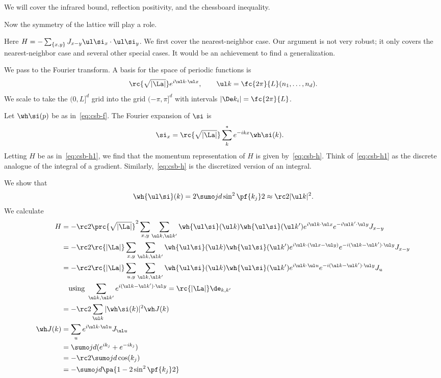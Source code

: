 

We will cover the infrared bound, reflection positivity, and the chessboard inequality.

Now the symmetry of the lattice will play a role.

Here $H=-\sum_{\{x,y\}} J_{x-y} \ul \si_x\cdot \ul \si_y$. We first cover the nearest-neighbor case. Our argument is not very robust; it only covers the nearest-neighbor case and several other special cases. It would be an achievement to find a generalization.

We pass to the Fourier transform. A basis for the space of periodic functions is 
\[
\rc{\sqrt{|\La|}}e^{i\ul k\cdot \ul x} ,\qquad \ul k = \fc{2\pi}{L} (n_1,\ldots, n_d).
\]
We scale to take the $(0,L]^d$ grid into the grid $(-\pi,\pi]^d$ with intervals $|\De k_i| = \fc{2\pi}{L}$. 

Let $\wh \si(p)$ be as in~\eqref{eq:csb-f}. The Fourier expansion of $\si$ is
\begin{align}
\si_x &= \rc{\sqrt{|\La|}} \sum_k^* e^{-ikx}\wh\si(k).
\end{align}
Letting $H$ be as in~\eqref{eq:csb-h1}, we find that the momentum representation of $H$ is given by~\eqref{eq:csb-h}.
Think of~\eqref{eq:csb-h1} as the discrete analogue of the integral of a gradient. Similarly,~\eqref{eq:csb-h} is the discretized version of an integral.

We show that
\[
\wh{\ul \si}(k) = 2\sumo jd \sin^2\pf{k_j}2 \approx \rc 2 |\ul k|^2.
\]
We calculate
\begin{align}
H &= -\rc 2\prc{\sqrt{|\La|}}^2\sum_{x,y} \sum_{\ul k, \ul k'} \wh{\ul\si}(\ul k)\wh{\ul\si}(\ul k') e^{i\ul k\cdot \ul x} e^{-i\ul k'\cdot \ul y}J_{x-y}\\
&=-\rc 2\rc{|\La|}  
\sum_{x,y} \sum_{\ul k, \ul k'} \wh{\ul\si}(\ul k)\wh{\ul\si}(\ul k') e^{i\ul k\cdot (\ul x-\ul y)} e^{-i(\ul k-\ul k')\cdot \ul y}J_{x-y}\\
&=-\rc 2\rc{|\La|} \sum_{u,y} \sum_{\ul k, \ul k'} \wh{\ul\si}(\ul k)\wh{\ul\si}(\ul k') e^{i\ul k\cdot \ul u} e^{-i(\ul k-\ul k')\cdot \ul y}J_{u}\\
&\quad \text{using }\sum_{\ul k,\ul k'} e^{i(\ul k-\ul k')\cdot\ul y} = \rc{|\La|} \de_{k,k'}\\
&=-\rc 2\sum_{\ul k} |\wh\si(k)|^2 \wh J(k)\\
\wh J(k) &= \sum_u e^{i\ul k\cdot \ul u} J_{\ul u} \\
&=\sumo jd (e^{ik_j}+e^{-ik_j})\\
&=%
-\rc 2 \sumo jd \cos(k_j)\\
&= -\sumo jd \pa{1-2\sin^2\pf{k_j}2}
\end{align}

